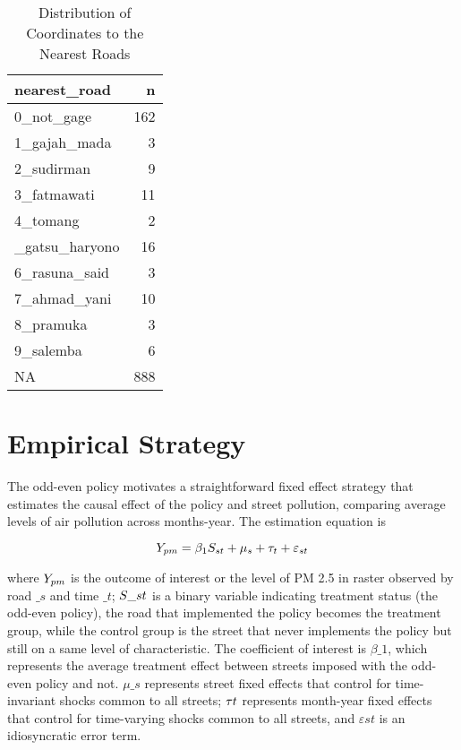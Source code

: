 \documentclass[
]{article}
\begin{document}
\begin{table}

\caption{\label{tab:unnamed-chunk-9}Distribution of Coordinates to the Nearest Roads}
\centering
\begin{tabular}[t]{lr}
\toprule
nearest\_road & n\\
\midrule
0\_not\_gage & 162\\
1\_gajah\_mada & 3\\
2\_sudirman & 9\\
3\_fatmawati & 11\\
4\_tomang & 2\\
\addlinespace
5\_gatsu\_haryono & 16\\
6\_rasuna\_said & 3\\
7\_ahmad\_yani & 10\\
8\_pramuka & 3\\
9\_salemba & 6\\
\addlinespace
NA & 888\\
\bottomrule
\end{tabular}
\end{table}

\hypertarget{empirical-strategy}{%
\section{Empirical Strategy}\label{empirical-strategy}}

The odd-even policy motivates a straightforward fixed effect strategy
that estimates the causal effect of the policy and street pollution,
comparing average levels of air pollution across months-year. The
estimation equation is

\[
\small Y_{pm} = \beta_{1} S_{st}  + \mu_{s} + \tau_t + \varepsilon_{st}
\]

where \(\small Y_{pm}\) is the outcome of interest or the level of PM
2.5 in raster observed by road \(\_{s}\) and time \(\_t\);
\(\small S\_{st}\) is a binary variable indicating treatment status (the
odd-even policy), the road that implemented the policy becomes the
treatment group, while the control group is the street that never
implements the policy but still on a same level of characteristic. The
coefficient of interest is \(\beta\_{1}\), which represents the average
treatment effect between streets imposed with the odd-even policy and
not. \(\mu\_s\) represents street fixed effects that control for
time-invariant shocks common to all streets; \(\tau\*t\*\) represents
month-year fixed effects that control for time-varying shocks common to
all streets, and \(\varepsilon{st}\) is an idiosyncratic error term.
\end{document}

